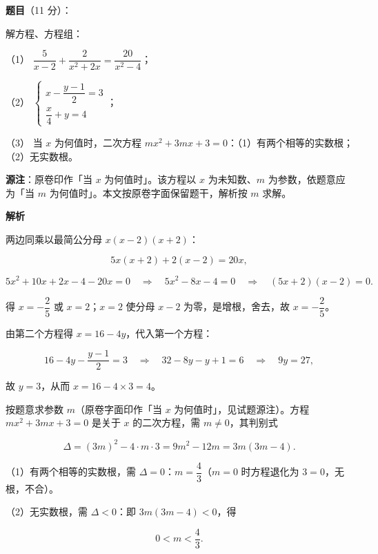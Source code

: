 \begin{answer}

\textbf{题目}（11 分）：

解方程、方程组：

（1） $\dfrac{5}{x-2}+\dfrac{2}{x^2+2x}=\dfrac{20}{x^2-4}$；

（2） $\begin{cases} x-\dfrac{y-1}{2}=3 \\ \dfrac{x}{4}+y=4 \end{cases}$；

（3） 当 $x$ 为何值时，二次方程 $mx^2+3mx+3=0$：（1）有两个相等的实数根；（2）无实数根。

\begin{gktip}
\textbf{源注}：原卷印作「当 $x$ 为何值时」。该方程以 $x$ 为未知数、$m$ 为参数，依题意应为「当 $m$ 为何值时」。本文按原卷字面保留题干，解析按 $m$ 求解。
\end{gktip}

\textbf{解析}


两边同乘以最简公分母 $x(x-2)(x+2)$：

\nopagebreak[4]
\[
5x(x+2)+2(x-2)=20x,
\]

\nopagebreak[4]
\[
5x^2+10x+2x-4-20x=0
\quad\Longrightarrow\quad
5x^2-8x-4=0
\quad\Longrightarrow\quad
(5x+2)(x-2)=0.
\]

得 $x=-\dfrac25$ 或 $x=2$；$x=2$ 使分母 $x-2$ 为零，是增根，舍去，故 $x=-\dfrac25$。


由第二个方程得 $x=16-4y$，代入第一个方程：

\nopagebreak[4]
\[
16-4y-\frac{y-1}{2}=3
\quad\Longrightarrow\quad
32-8y-y+1=6
\quad\Longrightarrow\quad
9y=27,
\]

故 $y=3$，从而 $x=16-4\times 3=4$。


按题意求参数 $m$（原卷字面印作「当 $x$ 为何值时」，见试题源注）。方程 $mx^2+3mx+3=0$ 是关于 $x$ 的二次方程，需 $m\ne 0$，其判别式

\nopagebreak[4]
\[
\Delta=(3m)^2-4\cdot m\cdot 3=9m^2-12m=3m(3m-4).
\]

（1）有两个相等的实数根，需 $\Delta=0$：$m=\dfrac43$（$m=0$ 时方程退化为 $3=0$，无根，不合）。

（2）无实数根，需 $\Delta<0$：即 $3m(3m-4)<0$，得

\nopagebreak[4]
\[
0<m<\frac43.
\]




\end{answer}
